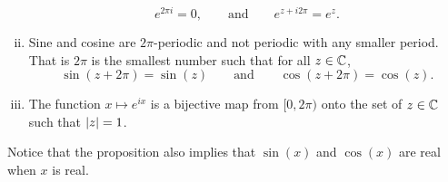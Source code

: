 \begin{prop}
\begin{enumerate}[(i)]
\begin{equation*}
e^{2\pi i} = 0, \qquad \text{and} \qquad e^{z + i 2\pi} = e^z.
\end{equation*}
\item
Sine and cosine are $2\pi$-periodic and not periodic with any smaller
period.  That is $2\pi$ is the smallest number such that for all $z \in {\mathbb{C}}$,
\begin{equation*}
\sin(z+2\pi) = \sin(z)
\qquad \text{and} \qquad
\cos(z+2\pi) = \cos(z) .
\end{equation*}
\item
The function $x \mapsto e^{ix}$ is a bijective map from $[0,2\pi)$
onto the set of $z \in {\mathbb{C}}$ such that $\lvert {z} \rvert = 1$.
\end{enumerate}
\end{prop}

Notice that the proposition also implies that $\sin(x)$ and $\cos(x)$ are 
real when $x$ is real.


